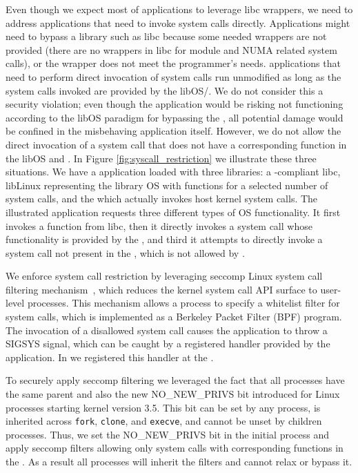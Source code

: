 Even though we expect most of \sysname{} applications to leverage libc
wrappers, we need to address applications that need to invoke system
calls directly. Applications might need to bypass a library such as
libc because some needed wrappers are not provided (there are no
wrappers in libc for module and NUMA related system calls), or the
wrapper does not meet the programmer’s needs. \sysname{} applications
that need to perform direct invocation of system calls run unmodified
as long as the system calls invoked are provided by the libOS/\pal{}. We
do not consider this a security violation; even though the application
would be risking not functioning according to the libOS paradigm for
bypassing the \pal{}, all potential damage would be confined in the
misbehaving application itself.  However, we do not allow the direct
invocation of a system call that does not have a corresponding
function in the libOS and \pal{}. In Figure \ref{fig:syscall_restriction}
we illustrate these three situations. We have a \sysname{} application
loaded with three libraries: a \sysname{}-compliant libc, libLinux
representing the library OS with functions for a selected number of
system calls, and the \pal{} which actually invokes host kernel system
calls. The illustrated application requests three different types of
OS functionality. It first invokes a function from libc, then it
directly invokes a system call whose functionality is provided by the
\pal{}, and third it attempts to directly invoke a system call not
present in the \pal{}, which is not allowed by \sysname{}.

We enforce system call restriction by leveraging seccomp Linux system
call filtering mechanism~\citep{seccomp}, which reduces the kernel
system call API surface to user-level processes. This mechanism allows
a process to specify a whitelist filter for system calls, which is
implemented as a Berkeley Packet Filter (BPF) program. The invocation
of a disallowed system call causes the application to throw a SIGSYS
signal, which can be caught by a registered handler provided by the
application. In \sysname{} we registered this handler at the \pal{}.

To securely apply seccomp filtering we leveraged the fact that all
\sysname{} processes have the same parent and also the new
NO\_NEW\_PRIVS bit introduced for Linux processes starting kernel
version 3.5. This bit can be set by any process, is inherited across
{\tt fork}, {\tt clone}, and {\tt execve}, and cannot be unset by
children processes. Thus, we set the NO\_NEW\_PRIVS bit in the initial
\sysname{} process and apply seccomp filters allowing only system calls
with corresponding functions in the \pal{}. As a result all \sysname{}
processes will inherit the filters and cannot relax or bypass it.


